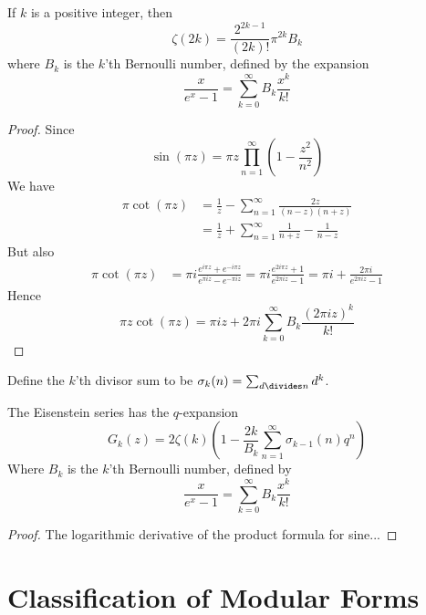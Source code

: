 \begin{lemma}
    If $k$ is a positive integer, then
    \[ \zeta(2k) = \frac{2^{2k-1}}{(2k)!} \pi^{2k} B_k \]
    where $B_k$ is the $k$'th Bernoulli number, defined by the expansion
    \[ \frac{x}{e^x - 1} = \sum_{k = 0}^\infty B_k \frac{x^k}{k!} \]
\end{lemma}
\begin{proof}
    Since
    \[ \sin(\pi z) = \pi z \prod_{n = 1}^\infty \left(1 - \frac{z^2}{n^2} \right) \]
    We have
    \begin{align*}
        \pi \cot(\pi z) &= \frac{1}{z} - \sum_{n = 1}^\infty \frac{2z}{(n-z)(n+z)}\\
        &= \frac{1}{z} + \sum_{n = 1}^\infty \frac{1}{n+z} - \frac{1}{n-z}
    \end{align*}
    But also
    \begin{align*}
        \pi \cot(\pi z) &= \pi i \frac{e^{i \pi z} + e^{- i \pi z}}{e^{\pi i z} - e^{- \pi i z}} = \pi i \frac{e^{2 i \pi z} + 1}{e^{2 \pi i z} - 1} = \pi i + \frac{2 \pi i}{e^{2 \pi i z} - 1}
    \end{align*}
    Hence
    \[ \pi z \cot(\pi z) = \pi i z + 2\pi i \sum_{k = 0}^\infty B_k \frac{(2 \pi i z)^k}{k!} \]
\end{proof}

Define the $k$'th divisor sum to be $\sigma_k(n) = \sum_{d \divides n} d^k$.

\begin{theorem}
    The Eisenstein series has the $q$-expansion
    \[ G_k(z) = 2 \zeta(k) \left( 1 - \frac{2k}{B_k} \sum_{n = 1}^\infty \sigma_{k-1}(n) q^n \right) \]
    Where $B_k$ is the $k$'th Bernoulli number, defined by
    \[ \frac{x}{e^x - 1} = \sum_{k = 0}^\infty B_k \frac{x^k}{k!} \]
\end{theorem}
\begin{proof}
    The logarithmic derivative of the product formula for sine...
\end{proof}

\section{Classification of Modular Forms}

